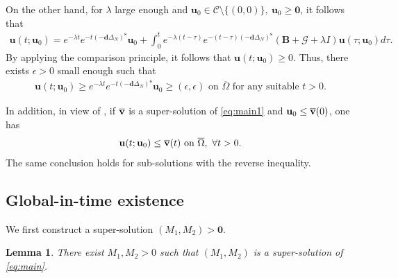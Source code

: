 \documentclass[a4paper,11pt]{amsart}
\newtheorem{lemma}[theorem]{Lemma}
\theoremstyle{definition}
\def\O{\Omega}
\numberwithin{equation}{section}
\theoremstyle{definition}
\def\O{\Omega}
\begin{document}
On the other hand, for $\lambda$ large enough and $\textbf{u}_0\in \mathcal{C}\setminus\{(0,0)\},~\textbf{u}_0\geq \textbf{0}$, it follows that
\begin{align*}
\textbf{u}(t;\textbf{u}_0)=e^{-\lambda t}e^{-t(-\textbf{d}\Delta_N)^\textbf{s}}\textbf{u}_0+\int_0^t e^{-\lambda (t-\tau)}e^{-(t-\tau)(-\textbf{d}\Delta_N)^\textbf{s}}\left(\mathbf{B}+\mathcal{G}+\lambda I\right)\textbf{u}(\tau;\textbf{u}_0)d\tau.
\end{align*}
By applying the comparison principle, it follows that $\textbf{u}(t;\textbf{u}_0)\geq 0$. Thus, there exists $\epsilon>0$ small enough such that
\begin{align*}
\textbf{u}(t;\textbf{u}_0)\geq e^{-\lambda t}e^{-t(-\textbf{d}\Delta_N)^\textbf{s}}\textbf{u}_0\geq (\epsilon,\epsilon) \text{ on }\overline{\O}\text{ for any suitable }t>0.
\end{align*}

In addition, in view of \cite[Proposition 5.1 - 5.4]{magal_monotone_2019}, if $\overline{\bf v}$ is a super-solution of \eqref{eq:main1} and $\textbf{u}_0\leq \overline{\bf v}(0)$, one has
\begin{align*}
\textbf{u}(t;\textbf{u}_0)\leq \overline{\bf v}(t) \text{ on }\overline{\O},~\forall t>0.
\end{align*}
The same conclusion holds for sub-solutions with the reverse inequality.

\subsection{\bf Global-in-time existence}
We first construct a super-solution $(M_1,M_2)>\textbf{0}$. 

\begin{lemma}\label{lemma2}
There exist $M_1, M_2 > 0$ such that $(M_1,M_2)$ is a super-solution of \eqref{eq:main}.


\end{lemma}
\end{document}
